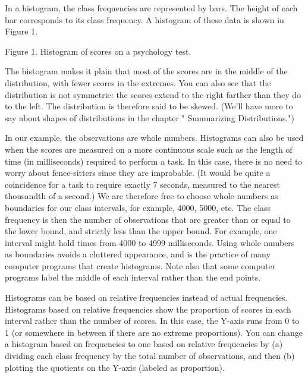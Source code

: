 \documentclass[
]{book}
\begin{document}
In a histogram, the class frequencies are represented by bars. The height of each bar corresponds to its class frequency. A histogram of these data is shown in Figure 1.

Figure 1. Histogram of scores on a psychology test.

The histogram makes it plain that most of the scores are in the middle of the distribution, with fewer scores in the extremes. You can also see that the distribution is not symmetric: the scores extend to the right farther than they do to the left. The distribution is therefore said to be skewed. (We'll have more to say about shapes of distributions in the chapter " Summarizing Distributions.")

In our example, the observations are whole numbers. Histograms can also be used when the scores are measured on a more continuous scale such as the length of time (in milliseconds) required to perform a task. In this case, there is no need to worry about fence-sitters since they are improbable. (It would be quite a coincidence for a task to require exactly 7 seconds, measured to the nearest thousandth of a second.) We are therefore free to choose whole numbers as boundaries for our class intervals, for example, 4000, 5000, etc. The class frequency is then the number of observations that are greater than or equal to the lower bound, and strictly less than the upper bound. For example, one interval might hold times from 4000 to 4999 milliseconds. Using whole numbers as boundaries avoids a cluttered appearance, and is the practice of many computer programs that create histograms. Note also that some computer programs label the middle of each interval rather than the end points.

Histograms can be based on relative frequencies instead of actual frequencies. Histograms based on relative frequencies show the proportion of scores in each interval rather than the number of scores. In this case, the Y-axis runs from 0 to 1 (or somewhere in between if there are no extreme proportions). You can change a histogram based on frequencies to one based on relative frequencies by (a) dividing each class frequency by the total number of observations, and then (b) plotting the quotients on the Y-axis (labeled as proportion).
\end{document}
